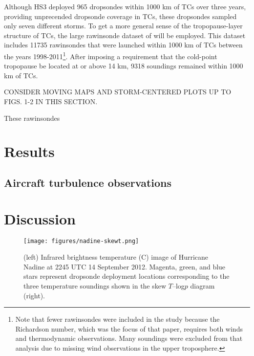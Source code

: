 Although HS3 deployed 965 dropsondes within 1000 km of TCs over three years, providing unprecended dropsonde coverage in TCs, these dropsondes sampled only seven different storms.
To get a more general sense of the tropopause-layer structure of TCs, the large rawinsonde dataset of \cite{DuranMolinari2016} will be employed.
This dataset includes 11735 rawinsondes that were launched within 1000 km of TCs between the years 1998-2011\footnote{Note that fewer rawinsondes were included in the \cite{DuranMolinari2016} study because the Richardson number, which was the focus of that paper, requires both winds and thermodynamic observations. Many soundings were excluded from that analysis due to missing wind observations in the upper troposphere.}.
After imposing a requirement that the cold-point tropopause be located at or above 14 km, 9318 soundings remained within 1000 km of TCs.

CONSIDER MOVING MAPS AND STORM-CENTERED PLOTS UP TO FIGS. 1-2 IN THIS SECTION.

These rawinsondes 

\section{Results}
\subsection{Aircraft turbulence observations}

\section{Discussion}
\label{sec:discussion}


\begin{figure*}[ht]
\centerline{\texttt{[image: figures/nadine-skewt.png]}}
   \caption{(left) Infrared brightness temperature (\textdegree{}C) image of Hurricane Nadine at 2245 UTC 14 September 2012. Magenta, green, and blue stars represent dropsonde deployment locations corresponding to the three temperature soundings shown in the skew $T$--log$p$ diagram (right).}
\label{fig:nadine-skewt}
\end{figure*}

